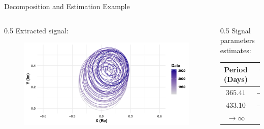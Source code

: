 \documentclass[pdf, unicode, ucs, notheorems]{beamer}
\newcommand{\bluetext}[1]{{\usebeamercolor[fg]{bluetext_color}#1}}
\theoremstyle{definition}
\begin{document}
\begin{frame}{Decomposition and Estimation Example}
  \begin{columns}
    \begin{column}{0.5\textwidth}
      Extracted signal:
      \begin{figure}[!ht]
        \center
        \includegraphics[width=\textwidth]{Earth_complex_signal.pdf}\\
      \end{figure}
    \end{column}
    \begin{column}{0.5\textwidth}
      Signal parameters estimates:
      \begin{table}
        \centering
        \begin{tabular}{c|c}
          Period (Days) & Change rate \\ \hline
          $365.41$ & $-5.5 \cdot 10^{-6}$ \\ \hline
          $433.10$ & $-2.2 \cdot 10^{-5}$ \\ \hline
          $\to \infty$ & $\phantom{-}2.7 \cdot 10^{-5}$
        \end{tabular}
      \end{table}
      \vspace*{0.6cm}
    \end{column}
  \end{columns}
\end{frame}

\end{document}
